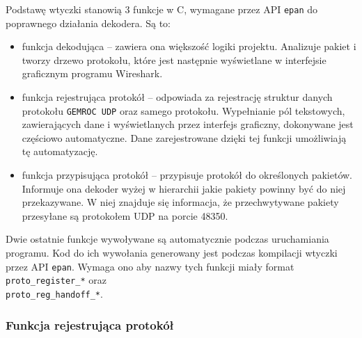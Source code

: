 \documentclass[a4paper, 11pt, twoside, openright]{article}
\begin{document}
	\indent\par
	Podstawę wtyczki stanowią 3 funkcje w C, wymagane przez API \texttt{epan} do poprawnego działania dekodera. Są to:
	\begin{itemize}
		\item funkcja dekodująca -- zawiera ona większość logiki projektu. Analizuje pakiet i tworzy drzewo protokołu,
			które jest następnie wyświetlane w interfejsie graficznym programu Wireshark.
		\item funkcja rejestrująca protokół -- odpowiada za rejestrację struktur danych protokołu \texttt{GEMROC UDP} oraz
			samego protokołu. Wypełnianie pól tekstowych, zawierających dane i wyświetlanych przez interfejs graficzny,
			dokonywane jest częściowo automatyczne. Dane zarejestrowane dzięki tej funkcji umożliwiają tę automatyzację.
		\item funkcja przypisująca protokół -- przypisuje protokół do określonych pakietów. Informuje ona dekoder wyżej
			w hierarchii jakie pakiety powinny być do niej przekazywane. W niej znajduje się informacja, że przechwytywane pakiety
			przesyłane są protokołem UDP na porcie 48350.
	\end{itemize}

	Dwie ostatnie funkcje wywoływane są automatycznie podczas uruchamiania programu. Kod do ich wywołania generowany jest
	podczas kompilacji wtyczki przez API \texttt{epan}. Wymaga ono aby nazwy tych funkcji miały format \texttt{proto\_register\_*} oraz \\
	\texttt{proto\_reg\_handoff\_*}.

	\subsubsection{Funkcja rejestrująca protokół}
\end{document}
